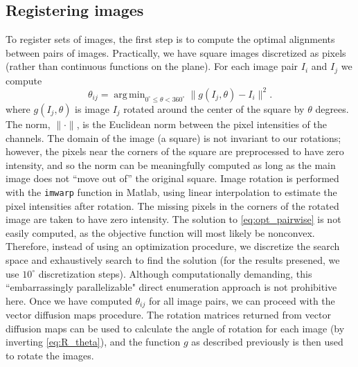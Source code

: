\documentclass[10pt,twocolumn]{article}
\DeclareMathOperator*{\argmin}{arg\,min}
\begin{document}
\subsection*{Registering images} \label{subsec:trans_rot_register}

To register sets of images, 
the first step is to compute the optimal alignments between pairs of images.
%
Practically, we have square images discretized as pixels (rather than continuous functions on the plane).
%
For each image pair $I_i$ and $I_j$ we compute
\begin{equation}\label{eq:opt_pairwise}
\theta_{ij} = \argmin_{
0^\circ \le \theta < 360^\circ }
 \|g(I_j, \theta) - I_i \|^2.
\end{equation}
where $g(I_j, \theta)$ is image $I_j$ rotated around the center of the square by $\theta$ degrees.
%
The norm, $\| \cdot \|$, is the Euclidean norm between the pixel intensities of the channels.
%
The domain of the image (a square) is not invariant to our rotations; however, the pixels near the corners of the square are preprocessed to have zero intensity, and so the norm can be meaningfully computed as long as the main image does not ``move out of'' the original square.
%
Image rotation is performed with the \texttt{imwarp} function in Matlab, using linear interpolation to estimate the pixel intensities after rotation.
%
The missing pixels in the corners of the rotated image are taken to have zero intensity.
%
The solution to \eqref{eq:opt_pairwise} is not easily computed, as the objective function will most likely be nonconvex.
%
Therefore, instead of using an optimization procedure, we discretize the search space and exhaustively search to find the solution (for the results presened, we use $10^\circ$ discretization steps).
%
%
%
Although computationally demanding, this ``embarrassingly parallelizable" direct enumeration approach is not prohibitive here.
%
Once we have computed $\theta_{ij}$ for all image pairs, we can proceed with the vector diffusion maps procedure.
%
The rotation matrices returned from vector diffusion maps can be used to calculate the angle of rotation for each image (by inverting \eqref{eq:R_theta}), and the function $g$ as described previously is then used to rotate the images.
\end{document}
